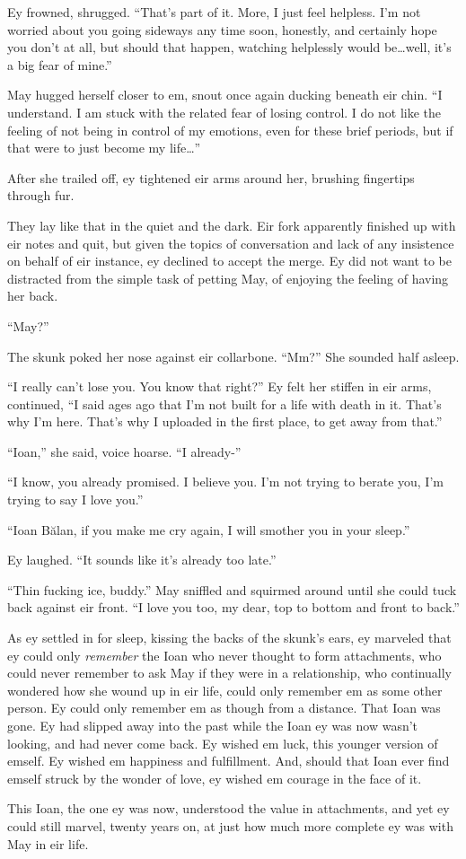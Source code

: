 Ey frowned, shrugged. ``That's part of it. More, I just feel helpless. I'm not worried about you going sideways any time soon, honestly, and certainly hope you don't at all, but should that happen, watching helplessly would be\ldots well, it's a big fear of mine.''

May hugged herself closer to em, snout once again ducking beneath eir chin. ``I understand. I am stuck with the related fear of losing control. I do not like the feeling of not being in control of my emotions, even for these brief periods, but if that were to just become my life\ldots{}''

After she trailed off, ey tightened eir arms around her, brushing fingertips through fur.

They lay like that in the quiet and the dark. Eir fork apparently finished up with eir notes and quit, but given the topics of conversation and lack of any insistence on behalf of eir instance, ey declined to accept the merge. Ey did not want to be distracted from the simple task of petting May, of enjoying the feeling of having her back.

``May?''

The skunk poked her nose against eir collarbone. ``Mm?'' She sounded half asleep.

``I really can't lose you. You know that right?'' Ey felt her stiffen in eir arms, continued, ``I said ages ago that I'm not built for a life with death in it. That's why I'm here. That's why I uploaded in the first place, to get away from that.''

``Ioan,'' she said, voice hoarse. ``I already-''

``I know, you already promised. I believe you. I'm not trying to berate you, I'm trying to say I love you.''

``Ioan Bălan, if you make me cry again, I will smother you in your sleep.''

Ey laughed. ``It sounds like it's already too late.''

``Thin fucking ice, buddy.'' May sniffled and squirmed around until she could tuck back against eir front. ``I love you too, my dear, top to bottom and front to back.''

As ey settled in for sleep, kissing the backs of the skunk's ears, ey marveled that ey could only \emph{remember} the Ioan who never thought to form attachments, who could never remember to ask May if they were in a relationship, who continually wondered how she wound up in eir life, could only remember em as some other person. Ey could only remember em as though from a distance. That Ioan was gone. Ey had slipped away into the past while the Ioan ey was now wasn't looking, and had never come back. Ey wished em luck, this younger version of emself. Ey wished em happiness and fulfillment. And, should that Ioan ever find emself struck by the wonder of love, ey wished em courage in the face of it.

This Ioan, the one ey was now, understood the value in attachments, and yet ey could still marvel, twenty years on, at just how much more complete ey was with May in eir life.
